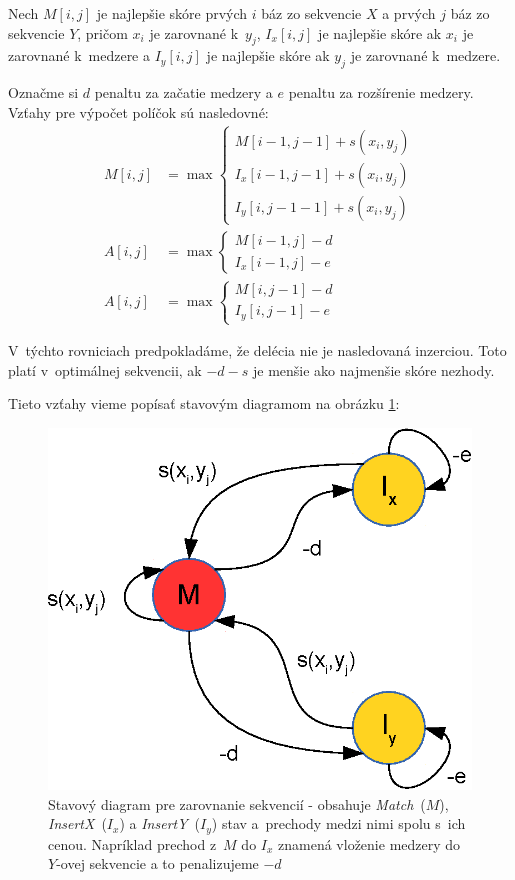 Nech $M[i,j]$ je najlepšie skóre prvých $i$ báz zo sekvencie $X$ a prvých $j$ báz zo sekvencie $Y$, pričom $x_i$ je zarovnané k~$y_j$, $I_x[i,j]$ je najlepšie skóre ak $x_i$ je zarovnané k~medzere a $I_y[i,j]$ je najlepšie skóre ak $y_j$ je zarovnané k~medzere.

Označme si $d$ penaltu za začatie medzery a $e$ penaltu za rozšírenie medzery. Vzťahy pre výpočet políčok sú nasledovné:
\begin{align*}
M[i,j] &= \max \left\{
\begin{array}{l}
M[i-1,j-1]+s(x_i, y_j)\\
I_x[i-1,j-1]+s(x_i, y_j)\\
I_y[i,j-1-1]+s(x_i, y_j)
\end{array} \right.\\
A[i,j] &= \max \left\{
\begin{array}{l}
M[i-1,j]-d\\
I_x[i-1,j]-e
\end{array} \right.\\
A[i,j] &= \max \left\{
\begin{array}{l}
M[i,j-1]-d\\
I_y[i,j-1]-e
\end{array} \right.
\end{align*}

V~týchto rovniciach predpokladáme, že delécia nie je nasledovaná inzerciou. Toto platí v~optimálnej sekvencii, ak $-d-s$ je menšie ako najmenšie skóre nezhody.

Tieto vzťahy vieme popísať stavovým diagramom na obrázku \ref{fig:alignment-fsa}:
\begin{figure}[h]
    \centering
    \includegraphics[width=.4\textwidth]{images/alignment_fsa}
    \caption[Stavový diagram pre zarovnanie sekvencií]{Stavový diagram pre zarovnanie sekvencií - obsahuje \textit{Match}~($M$), \textit{InsertX}~($I_x$) a \textit{InsertY}~($I_y$) stav a~prechody medzi nimi spolu s~ich cenou. Napríklad prechod z~$M$ do $I_x$ znamená vloženie medzery do $Y$-ovej sekvencie a to penalizujeme $-d$}
    \label{fig:alignment-fsa}
\end{figure}

